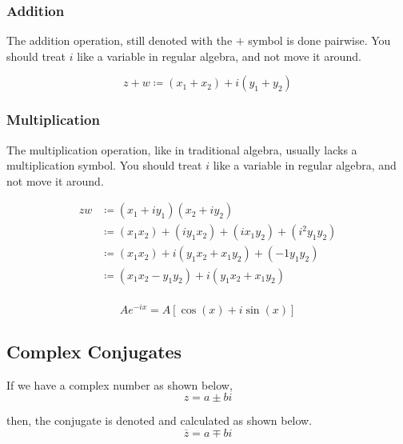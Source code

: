 \subsubsection{Addition}\label{subsubsec:Complex_Number-Addition}
The addition operation, still denoted with the $+$ symbol is done pairwise.
You should treat $i$ like a variable in regular algebra, and not move it around.

\begin{equation}\label{eq:Complex_Number-Addition}
  z+w \coloneqq (x_{1}+x_{2}) + i(y_{1}+y_{2})
\end{equation}

\subsubsection{Multiplication}\label{subsubsec:Complex_Number-Multiplication}
The multiplication operation, like in traditional algebra, usually lacks a multiplication symbol.
You should treat $i$ like a variable in regular algebra, and not move it around.

\begin{equation}\label{eq:Complex_Number-Addition}
  \begin{aligned}
    zw &\coloneqq (x_{1} + iy_{1}) (x_{2} + iy_{2}) \\
    &\coloneqq (x_{1}x_{2}) + (iy_{1}x_{2}) + (ix_{1}y_{2}) + (i^{2}y_{1}y_{2}) \\
    &\coloneqq (x_{1}x_{2}) + i(y_{1}x_{2} + x_{1}y_{2}) + (-1 y_{1}y_{2}) \\
    &\coloneqq (x_{1}x_{2} - y_{1}y_{2}) + i(y_{1}x_{2} + x_{1}y_{2}) \\
  \end{aligned}
\end{equation}

\begin{equation} \label{eq:Exponential to Rectangular}
  A e^{-ix} = A \left[ \cos \left( x \right) + i\sin \left( x \right) \right]
\end{equation}

\subsection{Complex Conjugates}\label{app:Complex_Conjugates}
If we have a complex number as shown below,
\begin{equation*}
  z = a \pm bi
\end{equation*}

then, the conjugate is denoted and calculated as shown below.
\begin{equation}\label{eq:Complex_Conjugates}
  \overline{z} = a \mp bi
\end{equation}

